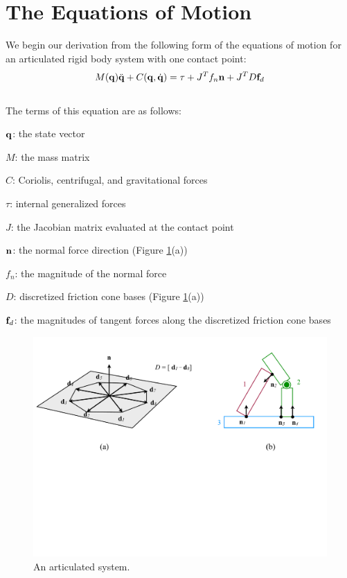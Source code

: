 \section{The Equations of Motion}
We begin our derivation from the following form of the equations of
motion for an articulated rigid body system with one contact point:
\begin{equation}
\label{eq:motionequations}
M(\mathbf{q})\ddot{\mathbf{q}} + C(\mathbf{q}, \dot{\mathbf{q}}) = \tau + J^T f_n \mathbf{n} + J^T
D \mathbf{f}_d
\end{equation}
\\
The terms of this equation are as follows:
\begin{packed_item}
\item $\mathbf{q}$: the state vector
\item $M$: the mass matrix
\item $C$: Coriolis, centrifugal, and gravitational forces
\item $\tau$: internal generalized forces
\item $J$: the Jacobian matrix evaluated at the contact point
\item $\mathbf{n}$: the normal force direction (Figure \ref{fig:example}(a))
\item $f_n$: the magnitude of the normal force
\item $D$: discretized friction cone bases (Figure \ref{fig:example}(a))
\item $\mathbf{f}_d$: the magnitudes of tangent forces along the discretized friction cone bases
\end{packed_item}

\begin{figure}
\includegraphics[width=6in]{example1.pdf}
\caption{An articulated system.}
\label{fig:example}
\end{figure}

